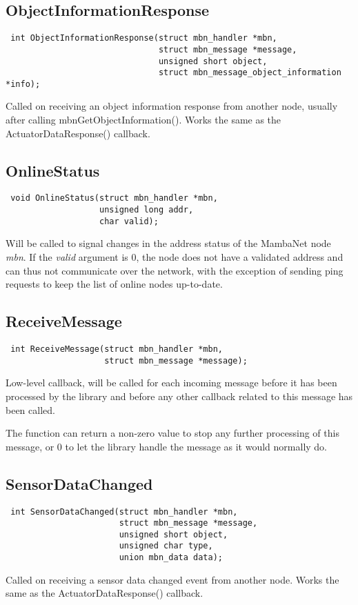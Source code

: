 \documentclass[a4paper]{report}
\begin{document}
\subsection{ObjectInformationResponse}
\begin{verbatim}
 int ObjectInformationResponse(struct mbn_handler *mbn,
                               struct mbn_message *message,
                               unsigned short object,
                               struct mbn_message_object_information *info);
\end{verbatim}
Called on receiving an object information response from another node, usually after calling mbnGetObjectInformation(). Works the same as the ActuatorDataResponse() callback.


\subsection{OnlineStatus}
\begin{verbatim}
 void OnlineStatus(struct mbn_handler *mbn,
                   unsigned long addr,
                   char valid);
\end{verbatim}
Will be called to signal changes in the address status of the MambaNet node \textit{mbn}. If the \textit{valid} argument is 0, the node does not have a validated address and can thus not communicate over the network, with the exception of sending ping requests to keep the list of online nodes up-to-date.


\subsection{ReceiveMessage}
\begin{verbatim}
 int ReceiveMessage(struct mbn_handler *mbn,
                    struct mbn_message *message);
\end{verbatim}
Low-level callback, will be called for each incoming message before it has been processed by the library and before any other callback related to this message has been called.

The function can return a non-zero value to stop any further processing of this message, or 0 to let the library handle the message as it would normally do.


\subsection{SensorDataChanged}
\begin{verbatim}
 int SensorDataChanged(struct mbn_handler *mbn,
                       struct mbn_message *message,
                       unsigned short object,
                       unsigned char type,
                       union mbn_data data);
\end{verbatim}
Called on receiving a sensor data changed event from another node. Works the same as the ActuatorDataResponse() callback.
\end{document}
